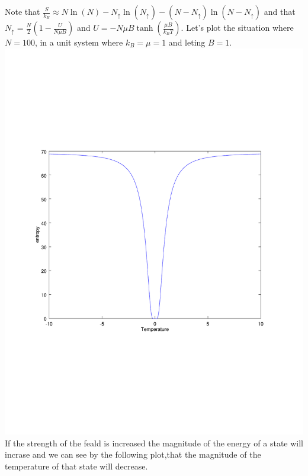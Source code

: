 \documentclass[12pt]{article}
\makeatletter
\theoremstyle{homework}
\newenvironment{exercise}[1]
{\def\@currentlabel{#1}\exercisecore}
{\endexercisecore}
\makeatother
\begin{document}
\begin{exercise}{3.22}
Note that $\frac{S}{k_B}\approx N\ln(N)-N_\uparrow \ln(N_\uparrow)-(N-N_\uparrow)\ln(N-N_\uparrow)$ and that $N_\uparrow=\frac{N}{2}(1-\frac{U}{N\mu B})$ and $U=-N\mu B\tanh(\frac{\mu B}{k_B T})$.  Let's plot the situation where $N=100$, in a unit system where $k_B=\mu = 1$ and leting $B=1$.\\
\includegraphics[scale=.6]{../octave/f2.pdf}\\
If the strength of the feald is increased the magnitude of the energy of a state will incrase and we can see by the following plot,that the magnitude of the temperature of that state will decrease.\\

\end{exercise}
\end{document}
